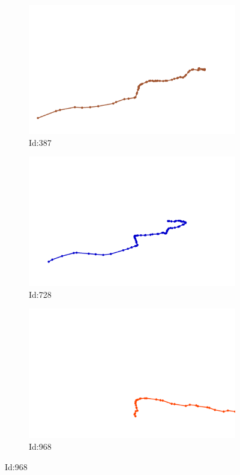 \documentclass[12pt,twoside]{report}
\begin{document}
\begin{figure}
\centering
\begin{subfigure}[b]{0.20\textwidth}
\centering
\includegraphics[width=\textwidth]{../../trajectories/387.png}
\caption{Id:387}
\end{subfigure}
\begin{subfigure}[b]{0.20\textwidth}
\centering
\includegraphics[width=\textwidth]{../../trajectories/728.png}
\caption{Id:728}
\end{subfigure}
\begin{subfigure}[b]{0.20\textwidth}
\centering
\includegraphics[width=\textwidth]{../../trajectories/968.png}
\caption{Id:968}
\end{subfigure}
\end{figure}
\end{document}
